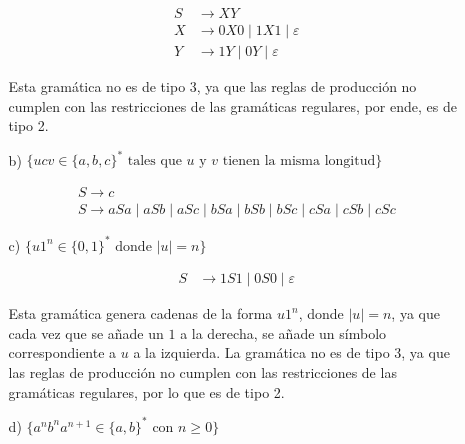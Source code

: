 \documentclass[12pt]{report} %
\begin{document}
\begin{ejercicio}
\begin{itemize}
\begin{itemize}
\begin{solucion}[media.a]
        \begin{align*}
        S &\rightarrow XY \\
        X &\rightarrow 0X0 \mid 1X1 \mid \varepsilon \\
        Y &\rightarrow 1Y \mid 0Y \mid \varepsilon 
        \end{align*}

        Esta gramática no es de tipo 3, ya que las reglas de producción no cumplen con las restricciones de las gramáticas regulares, por ende, es de tipo 2.

        \end{solucion}

        \item[b)] $\{ucv \in \{a, b, c\}^* \text{ tales que } u \text{ y } v \text{ tienen la misma longitud}\}$
        
        \begin{solucion}[media.b]

        \begin{align*}
        S \rightarrow c \\
        S \rightarrow  aSa \mid aSb \mid aSc \mid bSa \mid bSb \mid bSc \mid cSa \mid cSb \mid cSc
        \end{align*}


        \end{solucion}

        \item[c)] $\{u1^n \in \{0, 1\}^* \text{ donde } |u| = n\}$
        

        \begin{solucion}[media.c]

        \begin{align*}
        S &\rightarrow 1S1 \mid 0S0 \mid \varepsilon
        \end{align*}

        Esta gramática genera cadenas de la forma $u1^n$, donde $|u| = n$, ya que cada vez que se añade un $1$ a la derecha, se añade un símbolo correspondiente a $u$ a la izquierda. La gramática no es de tipo 3, ya que las reglas de producción no cumplen con las restricciones de las gramáticas regulares, por lo que es de tipo 2.

        \end{solucion}

        
        \item[d)] $\{a^n b^n a^{n+1} \in \{a, b\}^* \text{ con } n \geq 0\}$


        \begin{solucion}[media.d]


\end{solucion}
\end{itemize}
\end{itemize}
\end{ejercicio}
\end{document}
